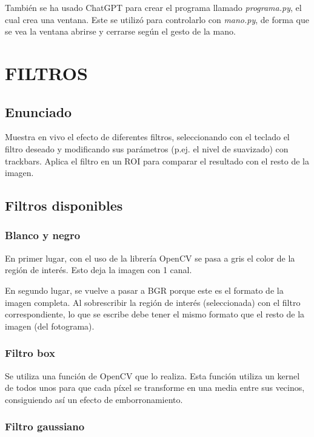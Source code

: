 \documentclass[12pt]{article}
\begin{document}
También se ha usado ChatGPT para crear el programa llamado \textit{programa.py}, el cual crea una ventana. Este se utilizó para controlarlo con \textit{mano.py}, de forma que se vea la ventana abrirse y cerrarse según el gesto de la mano.

\newpage

\section{FILTROS}
\subsection*{Enunciado}

Muestra en vivo el efecto de diferentes filtros, seleccionando con el teclado el filtro deseado y modificando sus parámetros (p.ej. el nivel de suavizado) con trackbars. Aplica el filtro en un ROI para comparar el resultado con el resto de la imagen.

\subsection*{Filtros disponibles}

\subsubsection*{Blanco y negro}

En primer lugar, con el uso de la librería OpenCV se pasa a gris el color de la región de interés. Esto deja la imagen con 1 canal.

En segundo lugar, se vuelve a pasar a BGR porque este es el formato de la imagen completa. Al sobrescribir la región de interés (seleccionada) con el filtro correspondiente, lo que se escribe debe tener el mismo formato que el resto de la imagen (del fotograma).

\subsubsection*{Filtro box}

Se utiliza una función de OpenCV que lo realiza. Esta función utiliza un kernel de todos unos para que cada píxel se transforme en una media entre sus vecinos, consiguiendo así un efecto de emborronamiento.

\subsubsection*{Filtro gaussiano}
\end{document}
